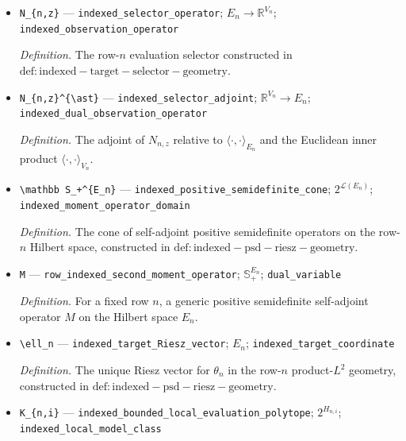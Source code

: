 \documentclass{article}
\begin{document}
\begin{itemize}
  \item \texttt{N\_\allowbreak{}\{n,\allowbreak{}z\}\allowbreak{}} --- \texttt{indexed\_\allowbreak{}selector\_\allowbreak{}operator}; \(E_n\to\mathbb R^{V_n}\); \texttt{indexed\_\allowbreak{}observation\_\allowbreak{}operator}
  \par\smallskip\noindent\emph{Definition.} The row-\(n\) evaluation selector constructed in \(\mathrm{def:indexed-target-selector-geometry}\).
  \item \texttt{N\_\allowbreak{}\{n,\allowbreak{}z\}\allowbreak{}\textasciicircum{}\{\textbackslash{}\allowbreak{}ast\}\allowbreak{}} --- \texttt{indexed\_\allowbreak{}selector\_\allowbreak{}adjoint}; \(\mathbb R^{V_n}\to E_n\); \texttt{indexed\_\allowbreak{}dual\_\allowbreak{}observation\_\allowbreak{}operator}
  \par\smallskip\noindent\emph{Definition.} The adjoint of \(N_{n,z}\) relative to \(\langle\cdot,\cdot\rangle_{E_n}\) and the Euclidean inner product \(\langle\cdot,\cdot\rangle_{V_n}\).
  \item \texttt{\textbackslash{}\allowbreak{}mathbb S\_\allowbreak{}+\allowbreak{}\textasciicircum{}\{E\_\allowbreak{}n\}\allowbreak{}} --- \texttt{indexed\_\allowbreak{}positive\_\allowbreak{}semidefinite\_\allowbreak{}cone}; \(2^{\mathcal L(E_n)}\); \texttt{indexed\_\allowbreak{}moment\_\allowbreak{}operator\_\allowbreak{}domain}
  \par\smallskip\noindent\emph{Definition.} The cone of self-adjoint positive semidefinite operators on the row-\(n\) Hilbert space, constructed in \(\mathrm{def:indexed-psd-riesz-geometry}\).
  \item \texttt{M} --- \texttt{row\_\allowbreak{}indexed\_\allowbreak{}second\_\allowbreak{}moment\_\allowbreak{}operator}; \(\mathbb S_+^{E_n}\); \texttt{dual\_\allowbreak{}variable}
  \par\smallskip\noindent\emph{Definition.} For a fixed row \(n\), a generic positive semidefinite self-adjoint operator \(M\) on the Hilbert space \(E_n\).
  \item \texttt{\textbackslash{}\allowbreak{}ell\_\allowbreak{}n} --- \texttt{indexed\_\allowbreak{}target\_\allowbreak{}Riesz\_\allowbreak{}vector}; \(E_n\); \texttt{indexed\_\allowbreak{}target\_\allowbreak{}coordinate}
  \par\smallskip\noindent\emph{Definition.} The unique Riesz vector for \(\theta_n\) in the row-\(n\) product-\(L^2\) geometry, constructed in \(\mathrm{def:indexed-psd-riesz-geometry}\).
  \item \texttt{K\_\allowbreak{}\{n,\allowbreak{}i\}\allowbreak{}} --- \texttt{indexed\_\allowbreak{}bounded\_\allowbreak{}local\_\allowbreak{}evaluation\_\allowbreak{}polytope}; \(2^{H_{n,i}}\); \texttt{indexed\_\allowbreak{}local\_\allowbreak{}model\_\allowbreak{}class}

\end{itemize}
\end{document}

